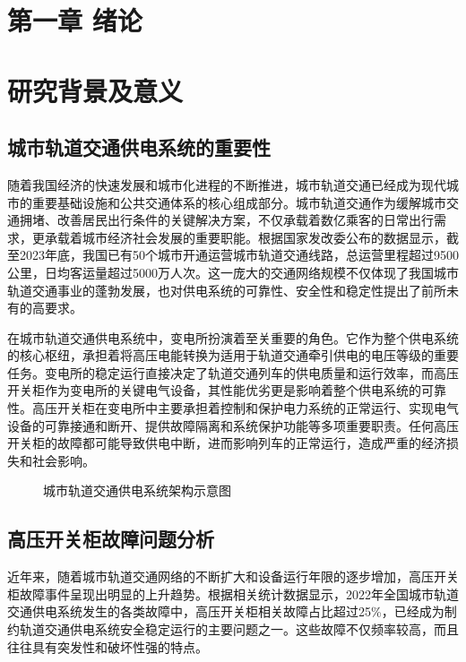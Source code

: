 \section{第一章 绪论}

\section{研究背景及意义}

\subsection{城市轨道交通供电系统的重要性}

随着我国经济的快速发展和城市化进程的不断推进，城市轨道交通已经成为现代城市的重要基础设施和公共交通体系的核心组成部分。城市轨道交通作为缓解城市交通拥堵、改善居民出行条件的关键解决方案，不仅承载着数亿乘客的日常出行需求，更承载着城市经济社会发展的重要职能。根据国家发改委公布的数据显示，截至2023年底，我国已有50个城市开通运营城市轨道交通线路，总运营里程超过9500公里，日均客运量超过5000万人次。这一庞大的交通网络规模不仅体现了我国城市轨道交通事业的蓬勃发展，也对供电系统的可靠性、安全性和稳定性提出了前所未有的高要求。

在城市轨道交通供电系统中，变电所扮演着至关重要的角色。它作为整个供电系统的核心枢纽，承担着将高压电能转换为适用于轨道交通牵引供电的电压等级的重要任务。变电所的稳定运行直接决定了轨道交通列车的供电质量和运行效率，而高压开关柜作为变电所的关键电气设备，其性能优劣更是影响着整个供电系统的可靠性。高压开关柜在变电所中主要承担着控制和保护电力系统的正常运行、实现电气设备的可靠接通和断开、提供故障隔离和系统保护功能等多项重要职责。任何高压开关柜的故障都可能导致供电中断，进而影响列车的正常运行，造成严重的经济损失和社会影响。

\begin{figure}[h]
\centering
\caption{城市轨道交通供电系统架构示意图}
\label{fig:railway_power_system}
\end{figure}

\subsection{高压开关柜故障问题分析}

近年来，随着城市轨道交通网络的不断扩大和设备运行年限的逐步增加，高压开关柜故障事件呈现出明显的上升趋势。根据相关统计数据显示，2022年全国城市轨道交通供电系统发生的各类故障中，高压开关柜相关故障占比超过25\%，已经成为制约轨道交通供电系统安全稳定运行的主要问题之一。这些故障不仅频率较高，而且往往具有突发性和破坏性强的特点。

